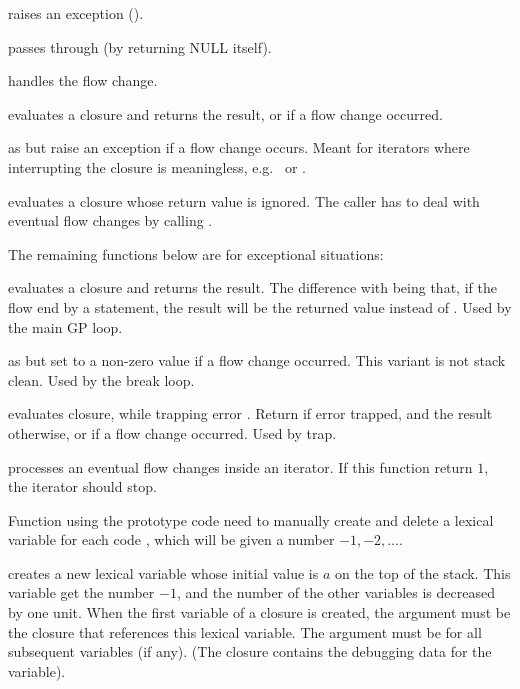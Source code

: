 \item raises an exception ().

\item passes through (by returning NULL itself).

\item handles the flow change.

 evaluates a closure and returns the result,
or  if a flow change occurred.

 as  but raise
an exception if a flow change occurs. Meant for iterators where
interrupting the closure is meaningless, e.g.~ or .

 evaluates a closure whose return
value is ignored. The caller has to deal with eventual flow changes by
calling .

The remaining functions below are for exceptional situations:

 evaluates a closure and returns the result.
The difference with  being that, if the flow end by a
 statement, the result will be the returned value instead of
. Used by the main GP loop.

 as 
but set  to a non-zero value if a flow change occurred. This
variant is not stack clean. Used by the break loop.

 evaluates closure, while
trapping error . Return  if error trapped, and the
result otherwise, or  if a flow change occurred. Used by trap.



 processes an eventual flow changes inside an
iterator. If this function return $1$, the iterator should stop.

\label{se:pushlex}

Function using the prototype code  need to manually create and delete a
lexical variable for each code , which will be given a number $-1, -2,
\ldots$.

 creates a new lexical variable whose
initial value is $a$ on the top of the stack. This variable get the number
$-1$, and the number of the other variables is decreased by one unit. When
the first variable of a closure is created, the argument  must be the
closure that references this lexical variable. The argument  must be
 for all subsequent variables (if any).  (The closure contains the
debugging data for the variable).

